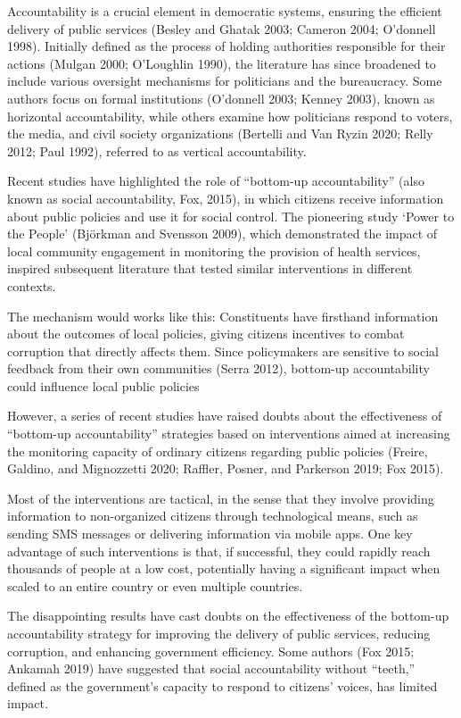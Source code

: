 \documentclass[]{AEA}
\begin{document}
Accountability is a crucial element in democratic systems, ensuring the
efficient delivery of public services (Besley and Ghatak 2003; Cameron
2004; O'donnell 1998). Initially defined as the process of holding
authorities responsible for their actions (Mulgan 2000; O'Loughlin
1990), the literature has since broadened to include various oversight
mechanisms for politicians and the bureaucracy. Some authors focus on
formal institutions (O'donnell 2003; Kenney 2003), known as horizontal
accountability, while others examine how politicians respond to voters,
the media, and civil society organizations (Bertelli and Van Ryzin 2020;
Relly 2012; Paul 1992), referred to as vertical accountability.

Recent studies have highlighted the role of ``bottom-up accountability''
(also known as social accountability, Fox, 2015), in which citizens
receive information about public policies and use it for social control.
The pioneering study `Power to the People' (Björkman and Svensson 2009),
which demonstrated the impact of local community engagement in
monitoring the provision of health services, inspired subsequent
literature that tested similar interventions in different contexts.

The mechanism would works like this: Constituents have firsthand
information about the outcomes of local policies, giving citizens
incentives to combat corruption that directly affects them. Since
policymakers are sensitive to social feedback from their own communities
(Serra 2012), bottom-up accountability could influence local public
policies

However, a series of recent studies have raised doubts about the
effectiveness of ``bottom-up accountability'' strategies based on
interventions aimed at increasing the monitoring capacity of ordinary
citizens regarding public policies (Freire, Galdino, and Mignozzetti
2020; Raffler, Posner, and Parkerson 2019; Fox 2015).

Most of the interventions are tactical, in the sense that they involve
providing information to non-organized citizens through technological
means, such as sending SMS messages or delivering information via mobile
apps. One key advantage of such interventions is that, if successful,
they could rapidly reach thousands of people at a low cost, potentially
having a significant impact when scaled to an entire country or even
multiple countries.

The disappointing results have cast doubts on the effectiveness of the
bottom-up accountability strategy for improving the delivery of public
services, reducing corruption, and enhancing government efficiency. Some
authors (Fox 2015; Ankamah 2019) have suggested that social
accountability without ``teeth,'' defined as the government's capacity
to respond to citizens' voices, has limited impact.
\end{document}
